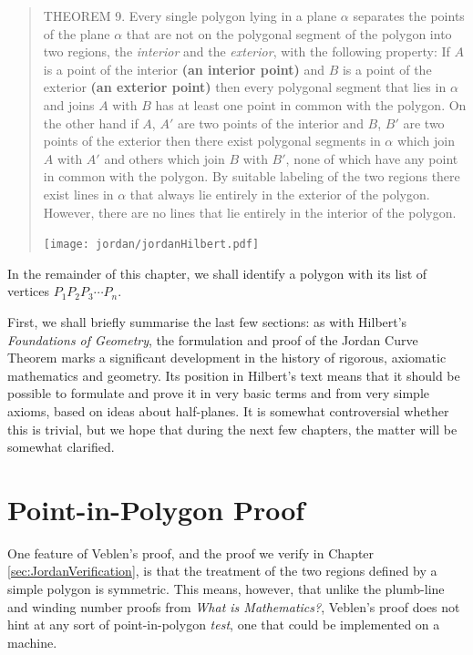 \begin{quote}
  THEOREM 9. Every single polygon lying in a plane $\alpha$ separates the points of the plane $\alpha$ that are not on the polygonal segment of the polygon into two regions, the \emph{interior} and the \emph{exterior}, with the following property: If $A$ is a point of the interior {\bfseries (an interior point)} and $B$ is a point of the exterior {\bfseries (an exterior point)} then every polygonal segment that lies in $\alpha$ and joins $A$ with $B$ has at least one point in common with the polygon. On the other hand if $A$, $A'$ are two points of the interior and $B$, $B'$ are two points of the exterior then there exist polygonal segments in $\alpha$ which join $A$ with $A'$ and others which join $B$ with $B'$, none of which have any point in common with the polygon. By suitable labeling of the two regions there exist lines in $\alpha$ that always lie entirely in the exterior of the polygon. However, there are no lines that lie entirely in the interior of the polygon.

  \centering\texttt{[image: jordan/jordanHilbert.pdf]}
\end{quote}

In the remainder of this chapter, we shall identify a polygon with its list of vertices $P_1P_2P_3\cdots P_n$.

First, we shall briefly summarise the last few sections: as with Hilbert's \emph{Foundations of Geometry}, the formulation and proof of the Jordan Curve Theorem marks a significant development in the history of rigorous, axiomatic mathematics and geometry. Its position in Hilbert's text means that it should be possible to formulate and prove it in very basic terms and from very simple axioms, based on ideas about half-planes. It is somewhat controversial whether this is trivial, but we hope that during the next few chapters, the matter will be somewhat clarified.

\section{Point-in-Polygon Proof}\label{sec:JordanCurveFirstProof}
One feature of Veblen's proof, and the proof we verify in Chapter \ref{sec:JordanVerification}, is that the treatment of the two regions defined by a simple polygon is symmetric. This means, however, that unlike the plumb-line and winding number proofs from \emph{What is Mathematics?}, Veblen's proof does not hint at any sort of point-in-polygon \emph{test}, one that could be implemented on a machine.

